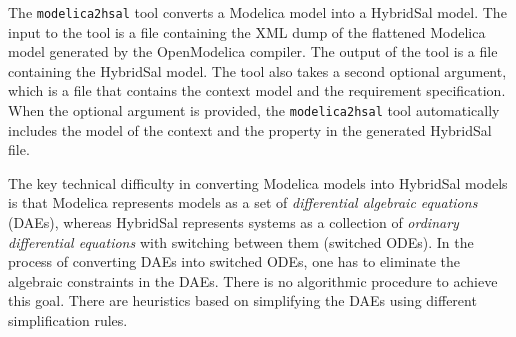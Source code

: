 \documentclass{llncs}
\begin{document}
The {\tt{modelica2hsal}} tool converts a Modelica model into a HybridSal model.
The input to the tool is a file containing the XML dump of the
flattened Modelica model generated by the OpenModelica compiler.
The output of the tool is a file containing the HybridSal model.
The tool also takes a second optional argument, which is a file that contains
the context model and the requirement specification.
When the optional argument is provided, the {\tt{modelica2hsal}} tool automatically
includes the model of the context and the property in the generated HybridSal file.

The key technical difficulty in converting Modelica models into HybridSal models is
that Modelica represents models as a set of {\em{differential algebraic equations}} (DAEs),
whereas HybridSal represents systems as a collection of {\em{ordinary differential equations}}
with switching between them (switched ODEs).
In the process of converting DAEs into switched ODEs, one has to eliminate the
algebraic constraints in the DAEs.
There is no algorithmic procedure to achieve this goal.  There are heuristics 
based on simplifying the DAEs using different simplification rules.
\end{document}
